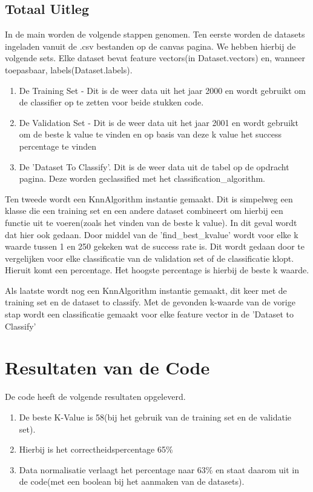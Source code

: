\documentclass[a4paper]{report}
\begin{document}
\section{Totaal Uitleg}
In de main worden de volgende stappen genomen.
Ten eerste worden de datasets ingeladen vanuit de .csv bestanden op de canvas pagina.
We hebben hierbij de volgende sets. Elke dataset bevat feature vectors(in Dataset.vectors) en, wanneer toepasbaar, labels(Dataset.labels).
\begin{enumerate}
  \item De Training Set - Dit is de weer data uit het jaar 2000 en wordt gebruikt om de classifier op te zetten voor beide stukken code.
  \item De Validation Set - Dit is de weer data uit het jaar 2001 en wordt gebruikt om de beste k value te vinden en op basis van deze k value het success percentage te vinden
  \item De 'Dataset To Classify'. Dit is de weer data uit de tabel op de opdracht pagina. Deze worden geclassified met het classification\_algorithm.
\end{enumerate}

Ten tweede wordt een KnnAlgorithm instantie gemaakt. Dit is simpelweg een klasse die een training set en een andere dataset combineert om hierbij een functie uit te voeren(zoals het vinden van de beste k value).
In dit geval wordt dat hier ook gedaan. Door middel van de 'find\_best\_kvalue' wordt voor elke k waarde tussen 1 en 250 gekeken wat de success rate is.
Dit wordt gedaan door te vergelijken voor elke classificatie van de validation set of de classificatie klopt. Hieruit komt een percentage. 
Het hoogste percentage is hierbij de beste k waarde.
\par\smallskip
Als laatste wordt nog een KnnAlgorithm instantie gemaakt, dit keer met de training set en de dataset to classify.
Met de gevonden k-waarde van de vorige stap wordt een classificatie gemaakt voor elke feature vector in de 'Dataset to Classify'



\chapter{Resultaten van de Code}
De code heeft de volgende resultaten opgeleverd.
\begin{enumerate}
  \item De beste K-Value is 58(bij het gebruik van de training set en de validatie set).
  \item Hierbij is het correctheidspercentage 65\%
  \item Data normalisatie verlaagt het percentage naar 63\% en staat daarom uit in de code(met een boolean bij het aanmaken van de datasets).
\end{enumerate}
\end{document}
